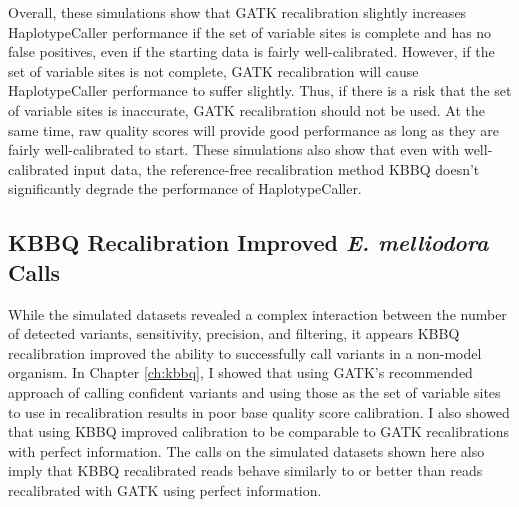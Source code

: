 Overall, these simulations show that GATK recalibration slightly increases HaplotypeCaller performance if the set of variable sites is complete and has no false positives, even if the starting data is fairly well-calibrated. However, if the set of variable sites is not complete, GATK recalibration will cause HaplotypeCaller performance to suffer slightly. Thus, if there is a risk that the set of variable sites is inaccurate, GATK recalibration should not be used. At the same time, raw quality scores will provide good performance as long as they are fairly well-calibrated to start. These simulations also show that even with well-calibrated input data, the reference-free recalibration method KBBQ doesn't significantly degrade the performance of HaplotypeCaller.

%





\subsection{KBBQ Recalibration Improved \textit{E. melliodora} Calls}

While the simulated datasets revealed a complex interaction between the number of detected variants, sensitivity, precision, and filtering, it appears KBBQ recalibration improved the ability to successfully call variants in a non-model organism. In Chapter \ref{ch:kbbq}, I showed that using GATK's recommended approach of calling confident variants and using those as the set of variable sites to use in recalibration results in poor base quality score calibration. I also showed that using KBBQ improved calibration to be comparable to GATK recalibrations with perfect information. The calls on the simulated datasets shown here also imply that KBBQ recalibrated reads behave similarly to or better than reads recalibrated with GATK using perfect information.

